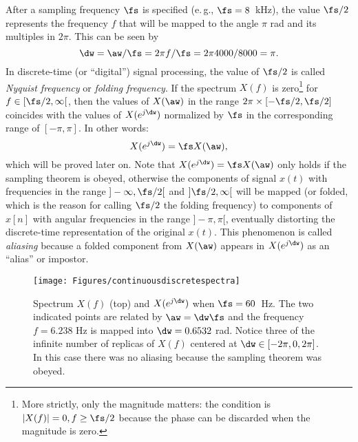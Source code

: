 After a sampling frequency $\fs$ is specified (e.\,g., $\fs= 8$~kHz), the value $\fs/2$  represents the frequency $f$ that will be mapped to the angle $\pi$ rad and its multiples in $2\pi$. This can be seen by
\begin{equation}
\dw = \aw / \fs = 2 \pi f / \fs = 2 \pi 4000/8000 = \pi.
\label{eq:foldingFrequencyExample}
\end{equation}
In discrete-time (or ``digital'') signal processing, the value of $\fs/2$ is called \emph{Nyquist frequency} or \emph{folding frequency}. If the spectrum  $X(f)$ is zero\footnote{More strictly, only the magnitude matters: the condition is $|X(f)|=0, f \ge \fs/2$ because the phase can be discarded when the magnitude is zero.} for $f \in [\fs/2, \infty[$, then the values of $X(\aw)$ in the range $2 \pi \times [-\fs/2, \fs/2]$ coincides  with the values of $X(e^{j\dw})$ normalized by $\fs$ in the corresponding range of $[-\pi, \pi]$. In other words:
\[
X(e^{j\dw}) = \fs X(\aw),
\]
which will be proved later on. Note that $X(e^{j\dw}) = \fs X(\aw)$ only holds if the sampling theorem is obeyed, otherwise the components of signal $x(t)$ with frequencies in the range $]-\infty,\fs/2[$ and $]\fs/2,\infty[$ will be mapped (or folded, which is the reason for calling $\fs/2$ the folding frequency) to components of $x[n]$ with angular frequencies in the range $]-\pi,\pi[$, eventually distorting the discrete-time representation of the original $x(t)$. This phenomenon is called \emph{aliasing} because a folded component from $X(\aw)$ appears in $X(e^{j\dw})$ as an ``alias'' or impostor.

\begin{figure}[!htb]
        \centering
                \texttt{[image: Figures/continuousdiscretespectra]}           
        \caption[{Spectrum $X(f)$ (top) and $X(e^{j\dw})$ when $\fs=60$~Hz.}]{Spectrum $X(f)$ (top) and $X(e^{j\dw})$ when $\fs=60$~Hz. The two indicated points are related by $\aw=\dw \fs$ and the frequency $f=6.238$ Hz is mapped into $\dw = 0.6532$ rad. Notice three of the infinite number of replicas of $X(f)$ centered at $\dw \in [-2\pi, 0, 2\pi]$. In this case there was no aliasing because the sampling theorem was obeyed.
\label{fig:continuousdiscretespectra}}
\end{figure}

